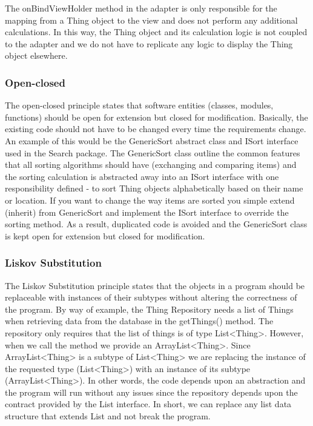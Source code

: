 \documentclass{article} %
\begin{document}
\noindent The onBindViewHolder method in the adapter is only responsible for the mapping from a Thing object to the view and does not perform any additional calculations. In this way, the Thing object and its calculation logic is not coupled to the adapter and we do not have to replicate any logic to display the Thing object elsewhere. 

\subsubsection{Open-closed}

The open-closed principle states that software entities (classes, modules, functions) should be open for extension but closed for modification. Basically, the existing code should not have to be changed every time the requirements change. An example of this would be the GenericSort abstract class and ISort interface used in the Search package. The GenericSort class outline the common features that all sorting algorithms should have (exchanging and comparing items) and the sorting calculation is abstracted away into an ISort interface with one responsibility defined - to sort Thing objects alphabetically based on their name or location. If you want to change the way items are sorted you simple extend (inherit) from GenericSort and implement the ISort interface to override the sorting method. As a result, duplicated code is avoided and the GenericSort class is kept open for extension but closed for modification.

\subsubsection{Liskov Substitution}

The Liskov Substitution principle states that the objects in a program should be replaceable with instances of their subtypes without altering the correctness of the program. By way of example, the Thing Repository needs a list of Things when retrieving data from the database in the getThings() method. The repository only requires that the list of things is of type List<Thing>. However, when we call the method we provide an ArrayList<Thing>. Since ArrayList<Thing> is a subtype of List<Thing> we are replacing the instance of the requested type (List<Thing>) with an instance of its subtype (ArrayList<Thing>). In other words, the code depends upon an abstraction and the program will run without any issues since the repository depends upon the contract provided by the List interface. In short, we can replace any list data structure that extends List and not break the program. 
\end{document}
